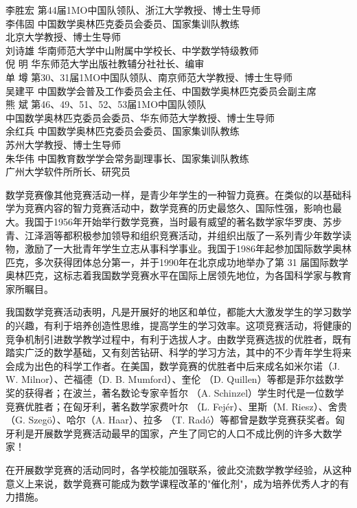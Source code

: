 \documentclass[10pt]{article}
\begin{document}
李胜宏 第44届1MO中国队领队、浙江大学教授、博士生导师\\
李伟固 中国数学奥林匹克委员会委员、国家集训队教练\\
北京大学教授、博士生导师\\
刘诗雄 华南师范大学中山附属中学校长、中学数学特级教师\\
倪 明 华东师范大学出版社教辅分社社长、编审\\
单 墫 第30、31届1MO中国队领队、南京师范大学教授、博士生导师\\
吴建平 中国数学会普及工作委员会主任、中国数学奥林匹克委员会副主席\\
熊 斌 第46、49、51、52、53届1MO中国队领队\\
中国数学奥林匹克委员会委员、华东师范大学教授、博士生导师\\
余红兵 中国数学奥林匹克委员会委员、国家集训队教练\\
苏州大学教授、博士生导师\\
朱华伟 中国教育数学学会常务副理事长、国家集训队教练\\
广州大学软件所所长、研究员

数学竞赛像其他竞赛活动一样，是青少年学生的一种智力竟赛。在类似的以基础科学为竞赛内容的智力竞赛活动中，数学竞赛的历史最悠久、国际性强，影响也最大。我国于1956年开始举行数学竞赛，当时最有威望的著名数学家华罗庚、苏步青、江泽涵等都积极参加领导和组织竞赛活动，并组织出版了一系列青少年数学读物，激励了一大批青年学生立志从事科学事业。我国于1986年起参加国际数学奥林匹克，多次获得团体总分第一，并于1990年在北京成功地举办了第 31 届国际数学奥林匹克，这标志着我国数学竞赛水平在国际上居领先地位，为各国科学家与教育家所瞩目。

我国数学竞赛活动表明，凡是开展好的地区和单位，都能大大激发学生的学习数学的兴趣，有利于培养创造性思维，提高学生的学习效率。这项竞赛活动，将健康的竞争机制引进数学教学过程中，有利于选拔人才。由数学竞赛选拔的优胜者，既有踏实广泛的数学基础，又有刻苦钻研、科学的学习方法，其中的不少青年学生将来会成为出色的科学工作者。在美国，数学竟赛的优胜者中后来成名如米尔诺（J. W. Milnor）、芒福德（D. B. Mumford）、奎伦 （D. Quillen）等都是菲尔兹数学奖的获得者；在波兰，著名数论专家辛哲尔 （A. Schinzel）学生时代是一位数学竞赛优胜者；在匈牙利，著名数学家费叶尔 （L. Fejér）、里斯（M. Riesz）、舍贵（G. Szegö）、哈尔（A. Haar）、拉多 （T. Radó）等都曾是数学竞赛获奖者。匈牙利是开展数学竞赛活动最早的国家，产生了同它的人口不成比例的许多大数学家！

在开展数学竞赛的活动同时，各学校能加强联系，彼此交流数学教学经验，从这种意义上来说，数学竟赛可能成为数学课程改革的"催化剂"，成为培养优秀人才的有力措施。
\end{document}
